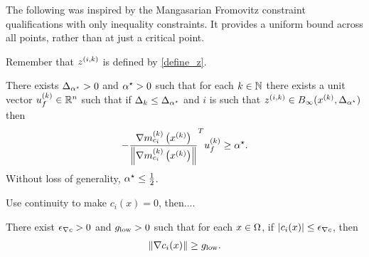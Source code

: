 
The following was inspired by the Mangasarian Fromovitz constraint qualifications with only inequality constraints.
It provides a uniform bound across all points, rather than at just a critical point.

% 

Remember that ${z^{(i, k)}}$ is defined by \cref{define_z}.
\begin{assumption}
\label{minangleassumption_alt}
There exists ${\Delta_{\alpha^{\star}}} > 0$ and ${ \alpha^{\star} } > 0$ such that for each $k \in \mathbb N$ there exists
a unit vector ${u^{(k)}_f} \in \mathbb R^n$
such that if $\Delta_k \le {\Delta_{\alpha^{\star}}}$ and
$i$ is such that ${z^{(i, k)}} \in B_{\infty}(x^{(k)}, {\Delta_{\alpha^{\star}}})$
then
\begin{align*}
-\frac {{\nabla m_{c_i}^{(k)}\left(x^{(k)}\right)}}{\left\|{\nabla m_{c_i}^{(k)}\left(x^{(k)}\right)}\right\|} ^T{u^{(k)}_f} \ge { \alpha^{\star} }.
\end{align*}
Without loss of generality, ${ \alpha^{\star} } \le \frac 1 2$.
\end{assumption}



\begin{boxedcomment}
Use continuity to make $c_i(x) = 0$, then....
\end{boxedcomment}

\begin{assumption}
\label{mingradassumption}
There exist ${\epsilon_{\nabla c}} > 0$ and ${ g_{\textrm{low}} } > 0$ such that for each $x \in \Omega$, if $\left|c_i(x)\right| \le {\epsilon_{\nabla c}}$, then
\begin{align*}
\| \nabla c_i(x) \| \ge { g_{\textrm{low}} }.
\end{align*}
\end{assumption}







